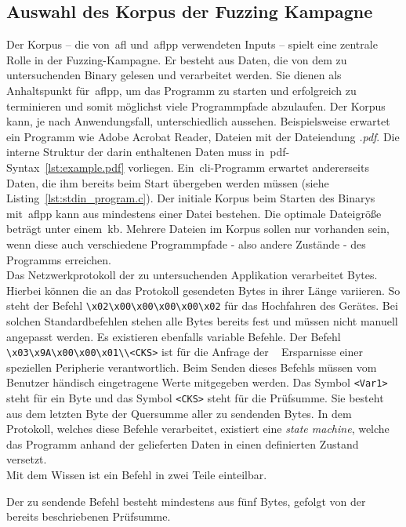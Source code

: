 
\subsection{Auswahl des Korpus der Fuzzing Kampagne}\label{subsec:corpus}

Der Korpus -- die von~\gls{afl} und~\gls{aflpp} verwendeten Inputs -- spielt eine zentrale Rolle in der Fuzzing-Kampagne.
Er besteht aus Daten, die von dem zu untersuchenden Binary gelesen und verarbeitet werden.
Sie dienen als Anhaltspunkt für~\gls{aflpp}, um das Programm zu starten und erfolgreich zu terminieren und somit möglichst viele Programmpfade abzulaufen.
Der Korpus kann, je nach Anwendungsfall, unterschiedlich aussehen.
Beispielsweise erwartet ein Programm wie Adobe Acrobat Reader, Dateien mit der Dateiendung \textit{.pdf}.
Die interne Struktur der darin enthaltenen Daten muss in~\gls{pdf}-Syntax~\ref{lst:example.pdf} vorliegen.
Ein~\gls{cli}-Programm erwartet andererseits Daten, die ihm bereits beim Start übergeben werden müssen (siehe Listing~\ref{lst:stdin_program.c}).
\linebreak
Der initiale Korpus beim Starten des Binarys mit~\gls{aflpp} kann aus mindestens einer Datei bestehen.
Die optimale Dateigröße beträgt unter einem~\gls{kb}.
Mehrere Dateien im Korpus sollen nur vorhanden sein, wenn diese auch verschiedene Programmpfade - also andere Zustände - des Programms erreichen.\\
\linebreak
Das Netzwerkprotokoll der zu untersuchenden Applikation verarbeitet Bytes.
Hierbei können die an das Protokoll gesendeten Bytes in ihrer Länge variieren.
So steht der Befehl \texttt{\textbackslash x02\textbackslash x00\textbackslash x00\textbackslash x00\textbackslash x00\textbackslash x02}
für das Hochfahren des Gerätes.
Bei solchen Standardbefehlen stehen alle Bytes bereits fest und müssen nicht manuell angepasst werden.
Es existieren ebenfalls variable Befehle.
Der Befehl \texttt{\textbackslash x03\textbackslash x9A\textbackslash x00\textbackslash x00\textbackslash x01\textbackslash<Var1>\textbackslash<CKS>}
ist für die Anfrage der ~ Ersparnisse einer speziellen Peripherie verantwortlich.
Beim Senden dieses Befehls müssen vom Benutzer händisch eingetragene Werte mitgegeben werden.
Das Symbol \texttt{<Var1>} steht für ein Byte und das Symbol \texttt{<CKS>} steht für die Prüfsumme.
Sie besteht aus dem letzten Byte der Quersumme aller zu sendenden Bytes.
In dem Protokoll, welches diese Befehle verarbeitet, existiert eine \textit{state machine}, welche das Programm anhand der gelieferten
Daten in einen definierten Zustand versetzt. \\
\linebreak\linebreak
Mit dem Wissen ist ein Befehl in zwei Teile einteilbar.

Der zu sendende Befehl besteht mindestens aus fünf Bytes, gefolgt von der bereits beschriebenen Prüfsumme.

